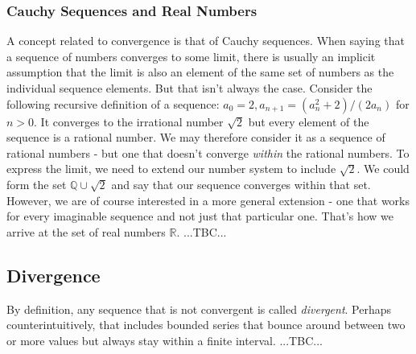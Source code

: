 \subsubsection{Cauchy Sequences and Real Numbers}
A concept related to convergence is that of Cauchy sequences. When saying that a sequence of numbers converges to some limit, there is usually an implicit assumption that the limit is also an element of the same set of numbers as the individual sequence elements. But that isn't always the case. Consider the following recursive definition of a sequence: $a_0 = 2, a_{n+1} = (a_n^2 + 2) / (2 a_n)$ for $n > 0$. It converges to the irrational number $\sqrt{2}$ but every element of the sequence is a rational number. We may therefore consider it as a sequence of rational numbers - but one that doesn't converge \emph{within} the rational numbers. To express the limit, we need to extend our number system to include $\sqrt{2}$. We could form the set $\mathbb{Q} \cup \sqrt{2}$ and say that our sequence converges within that set. However, we are of course interested in a more general extension - one that works for every imaginable sequence and not just that particular one. That's how we arrive at the set of real numbers $\mathbb{R}$. ...TBC...




\subsection{Divergence}
By definition, any sequence that is not convergent is called \emph{divergent}. Perhaps counterintuitively, that includes bounded series that bounce around between two or more values but always stay within a finite interval. ...TBC...

